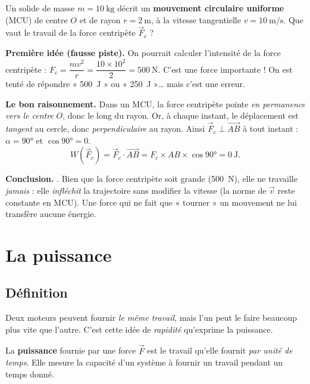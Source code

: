 \documentclass[11pt,a4paper]{article}
\newcommand{\vv}[1]{\vec{#1}}
\begin{document}
\begin{exemple}
Un solide de masse $m=\SI{10}{\kilogram}$ décrit un \textbf{mouvement circulaire uniforme} (MCU)
de centre $O$ et de rayon $r=\SI{2}{\metre}$, à la vitesse tangentielle $v=\SI{10}{\metre\per\second}$.
Que vaut le travail de la force centripète $\vv F_c$ ?

\smallskip
\textbf{Première idée (fausse piste).} On pourrait calculer l'intensité de la force centripète :
\(F_c=\dfrac{m v^2}{r}=\dfrac{10\times 10^2}{2}=\SI{500}{\newton}.\) C'est une force importante !
On est tenté de répondre « \SI{500}{\joule} » ou « \SI{250}{\joule} »… mais c'est une erreur.

\textbf{Le bon raisonnement.} Dans un MCU, la force centripète pointe \emph{en permanence vers le
centre} $O$, donc le long du rayon. Or, à chaque instant, le déplacement est \emph{tangent} au
cercle, donc \emph{perpendiculaire} au rayon. Ainsi $\vv F_c\perp\vv{AB}$ à tout instant :
$\alpha=\ang{90}$ et $\cos\ang{90}=0$.
\[
W(\vv F_c)=\vv F_c\cdot\vv{AB}=F_c\times AB\times\cos\ang{90}=\SI{0}{\joule}.
\]

\textbf{Conclusion.} \boxed{W(\vv F_c)=\SI{0}{\joule}}. Bien que la force centripète soit grande
(\SI{500}{\newton}), elle ne travaille \emph{jamais} : elle \emph{infléchit} la trajectoire sans
modifier la vitesse (la norme de $\vv v$ reste constante en MCU). Une force qui ne fait que
« tourner » un mouvement ne lui transfère aucune énergie.
\end{exemple}

\section{La puissance}
\subsection{Définition}

Deux moteurs peuvent fournir \emph{le même travail}, mais l'un peut le faire beaucoup plus vite que
l'autre. C'est cette idée de \emph{rapidité} qu'exprime la puissance.

\begin{definition}
La \textbf{puissance} fournie par une force $\vv F$ est le travail qu'elle fournit \emph{par unité
de temps}. Elle mesure la capacité d'un système à fournir un travail pendant un temps donné.
\end{definition}
\end{document}
